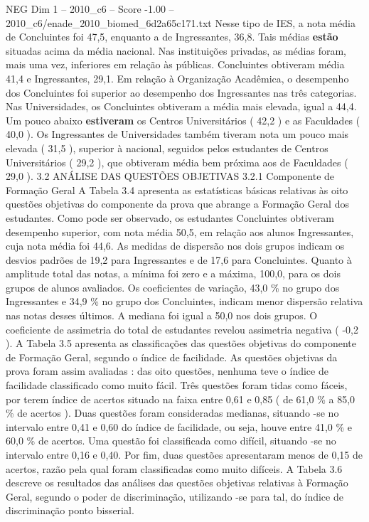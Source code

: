 \begin{textsample}{NEG Dim 1 – 2010\_c6 – Score -1.00 – 2010\_c6/enade\_2010\_biomed\_6d2a65c171.txt}
Nesse tipo de IES, a nota média de Concluintes foi 47,5, enquanto a de Ingressantes, 36,8.
Tais médias \textbf{estão} situadas acima da média nacional.
Nas instituições privadas, as médias foram, mais uma vez, inferiores em relação às públicas.
Concluintes obtiveram média 41,4 e Ingressantes, 29,1.
Em relação à Organização Acadêmica, o desempenho dos Concluintes foi superior ao desempenho dos Ingressantes nas três categorias.
Nas Universidades, os Concluintes obtiveram a média mais elevada, igual a 44,4.
Um pouco abaixo \textbf{estiveram} os Centros Universitários ( 42,2 ) e as Faculdades ( 40,0 ).
Os Ingressantes de Universidades também tiveram nota um pouco mais elevada ( 31,5 ), superior à nacional, seguidos pelos estudantes de Centros Universitários ( 29,2 ), que obtiveram média bem próxima aos de Faculdades ( 29,0 ). 3.2 ANÁLISE DAS QUESTÕES OBJETIVAS 3.2.1 Componente de Formação Geral A Tabela 3.4 apresenta as estatísticas básicas relativas às oito questões objetivas do componente da prova que abrange a Formação Geral dos estudantes.
Como pode ser observado, os estudantes Concluintes obtiveram desempenho superior, com nota média 50,5, em relação aos alunos Ingressantes, cuja nota média foi 44,6.
As medidas de dispersão nos dois grupos indicam os desvios padrões de 19,2 para Ingressantes e de 17,6 para Concluintes.
Quanto à amplitude total das notas, a mínima foi zero e a máxima, 100,0, para os dois grupos de alunos avaliados.
Os coeficientes de variação, 43,0 \% no grupo dos Ingressantes e 34,9 \% no grupo dos Concluintes, indicam menor dispersão relativa nas notas desses últimos.
A mediana foi igual a 50,0 nos dois grupos.
O coeficiente de assimetria do total de estudantes revelou assimetria negativa ( -0,2 ).
A Tabela 3.5 apresenta as classificações das questões objetivas do componente de Formação Geral, segundo o índice de facilidade.
As questões objetivas da prova foram assim avaliadas : das oito questões, nenhuma teve o índice de facilidade classificado como muito fácil.
Três questões foram tidas como fáceis, por terem índice de acertos situado na faixa entre 0,61 e 0,85 ( de 61,0 \% a 85,0 \% de acertos ).
Duas questões foram consideradas medianas, situando -se no intervalo entre 0,41 e 0,60 do índice de facilidade, ou seja, houve entre 41,0 \% e 60,0 \% de acertos.
Uma questão foi classificada como difícil, situando -se no intervalo entre 0,16 e 0,40.
Por fim, duas questões apresentaram menos de 0,15 de acertos, razão pela qual foram classificadas como muito difíceis.
A Tabela 3.6 descreve os resultados das análises das questões objetivas relativas à Formação Geral, segundo o poder de discriminação, utilizando -se para tal, do índice de discriminação ponto bisserial.

\end{textsample}
